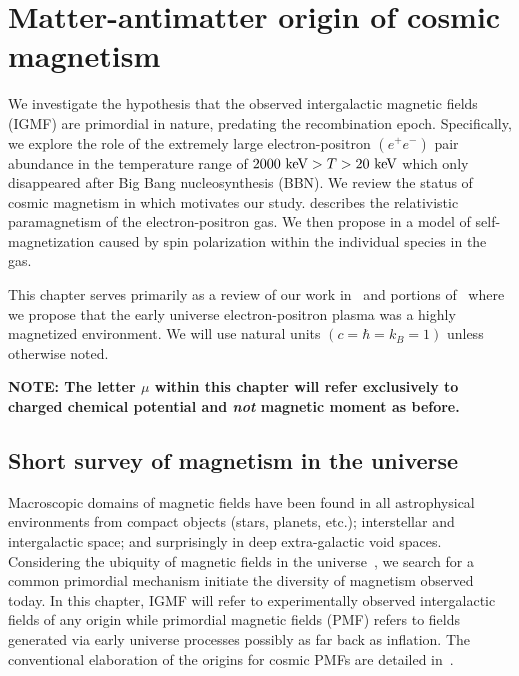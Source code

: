 \chapter{Matter-antimatter origin of cosmic magnetism}
\label{chap:cosmo}
\noindent We investigate the hypothesis that the observed intergalactic magnetic fields (IGMF) are primordial in nature, predating the recombination epoch. Specifically, we explore the role of the extremely large electron-positron $(e^{+}e^{-})$ pair abundance in the temperature range of $2000\text{ keV}>T>20\text{ keV}$ which only disappeared after Big Bang nucleosynthesis (BBN). We review the status of cosmic magnetism in  which motivates our study.  describes the relativistic paramagnetism of the electron-positron gas. We then propose in  a model of self-magnetization caused by spin polarization within the individual species in the gas.

This chapter serves primarily as a review of our work in~\cite{Steinmetz:2023nsc} and portions of~\cite{Rafelski:2023emw} where we propose that the early universe electron-positron plasma was a highly magnetized environment. We will use natural units $(c=\hbar=k_{B}=1)$ unless otherwise noted.

\begin{center}
    \textbf{NOTE: The letter $\mu$ within this chapter will refer exclusively to charged chemical potential and \emph{not} magnetic moment as before.}
\end{center}

\section{Short survey of magnetism in the universe}
\label{sec:universe}
\noindent Macroscopic domains of magnetic fields have been found in all astrophysical environments from compact objects (stars, planets, etc.); interstellar and intergalactic space; and surprisingly in deep extra-galactic void spaces. Considering the ubiquity of magnetic fields in the universe~\citep{Giovannini:2017rbc,Giovannini:2003yn,Kronberg:1993vk}, we search for a common primordial mechanism initiate the diversity of magnetism observed today. In this chapter, IGMF will refer to experimentally observed intergalactic fields of any origin while primordial magnetic fields (PMF) refers to fields generated via early universe processes possibly as far back as inflation. The conventional elaboration of the origins for cosmic PMFs are detailed in~\citep{Gaensler:2004gk,Durrer:2013pga,AlvesBatista:2021sln}.

